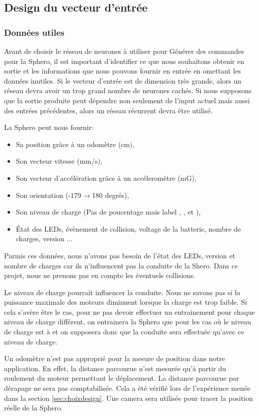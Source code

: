 \subsection{Design du vecteur d'entrée}
\subsubsection{Données utiles}
Avant de choisir le réseau de neurones à utiliser pour Générer des commandes pour la Sphero, il est important d'identifier ce que nous souhaitons obtenir en sortie et les informations que nous pouvons fournir en entrée en omettant les données inutiles.
Si le vecteur d'entrée est de dimension très grande, alors un réseau \rbf devra avoir un trop grand nombre de neurones cachés\cite{Gauthier}.
Si nous supposons que la sortie produite peut dépendre non seulement de l'input actuel mais aussi des entrées précédentes, alors un réseau récurrent devra être utilisé.

La Sphero peut nous fournir:\cite{SDKofficiels}
\begin{itemize}
 \item Sa position grâce à un odomètre (cm),
 \item Son vecteur vitesse (mm/s),
 \item Son vecteur d'accélération grâce à un accéleromètre (mG),
 \item Son orientation (-179$\rightarrow$180 degrés),
 \item Son niveau de charge (Pas de poucentage mais label , ,  et ),
 \item État des LEDs, évènement de collision, voltage de la batterie, nombre de charges, version ...
\end{itemize}

Parmis ces données, nous n'avons pas besoin de l'état des LEDs, version et nombre de charges car ils n'influencent pas la conduite de la Shero.
Dans ce projet, nous ne prenons pas en compte les éventuels collisions.

Le niveau de charge pourrait influencer la conduite.
Nous ne savons pas si la puissance maximale des moteurs diminuent lorsque la charge est trop faible.
Si cela s'avère être le cas, pour ne pas devoir effectuer un entrainement pour chaque niveau de charge différent, on entrainera la Sphero que pour les cas où le niveau de charge est à  et on supposera donc que la conduite sera effectuée qu'avec ce niveau de charge.

Un odomètre n'est pas approprié pour la mesure de position dans notre application.
En effet, la distance parcourue n'est mesurée qu'à partir du roulement du moteur permettant le déplacement.
La distance parcourue par dérapage ne sera pas comptabilisée.
Cela a été vérifié lors de l'expérience menée dans la section \ref{sec:choixdesign}.
Une camera sera utilisée pour tracer la position réelle de la Sphero.

